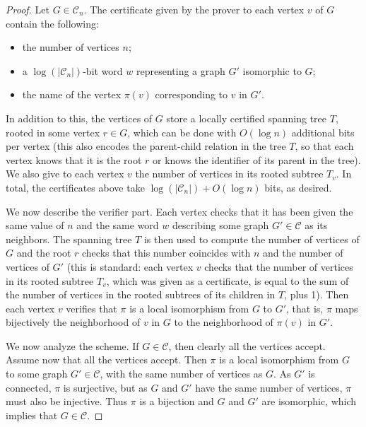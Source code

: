 \documentclass[a4paper,reqno, 12pt]{amsart}
\begin{document}
\begin{proof}
Let $G\in \mathcal{C}_n$. The certificate given by the prover to
each vertex $v$ of $G$ contain the following:

\begin{itemize}
\item the number of vertices $n$;
\item a $\log(|\mathcal{C}_n|)$-bit word $w$ representing a graph $G'$ isomorphic to $G$;
\item the name of the vertex $\pi(v)$ corresponding to $v$ in $G'$.
\end{itemize}
In addition to this, the vertices of $G$ store a locally certified spanning
tree $T$, rooted in some vertex $r\in G$, which can be done with
$O(\log n)$ additional bits per vertex (this also encodes the
parent-child relation in the tree $T$, so that each vertex knows that
it is the root $r$ or knows the identifier of its parent in the
tree). We also give to each vertex $v$ the number of vertices in its
rooted subtree $T_v$.
In total, the certificates
above take $\log(|\mathcal{C}_n|)+O(\log n)$ bits, as desired.

\medskip

We now describe the verifier part. Each
vertex checks that it has been given the same value of $n$ and the same
word $w$ describing some graph $G'\in \mathcal{C}$ as its neighbors. The spanning tree $T$ is
then used to compute the number of vertices of $G$ and the root $r$
checks that this number coincides with $n$ and the number of vertices
of $G'$ (this is standard: each
vertex $v$ checks that the number of vertices in its rooted subtree
$T_v$, which was given as a certificate, is equal to the sum of the
number of vertices in the rooted subtrees of its children in $T$, plus
1).
Then each vertex $v$
verifies that $\pi$ is a local isomorphism from $G$ to $G'$, that is,
$\pi$ maps bijectively the neighborhood of $v$ in $G$ to the neighborhood of
$\pi(v)$ in $G'$.

\medskip

We now analyze the scheme. If $G\in \mathcal{C}$, then clearly all the
vertices accept. Assume now that all the vertices accept. Then $\pi$
is a local isomorphism from $G$ to some graph $G'\in \mathcal{C}$,
with the same number of vertices as $G$. As $G'$ is connected, $\pi$
is surjective, but as $G$
and $G'$ have the same number of vertices, $\pi$ must also be
injective. Thus $\pi$ is a bijection and $G$ and $G'$ are isomorphic,
which implies that $G\in \mathcal{C}$.
\end{proof}
\end{document}
